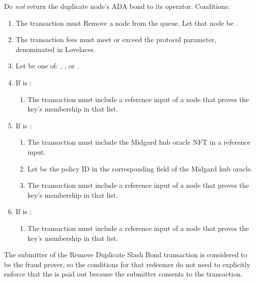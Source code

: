 \documentclass[../midgard.tex]{subfiles}
\begin{document}
\begin{description}
      Do \emph{not} return the duplicate node's ADA bond to its operator.
      Conditions:
        \begin{enumerate}
            \item The transaction must Remove a node from the  queue.
              Let that node be .
            \item The transaction fees must meet or exceed the  protocol parameter, denominated in Lovelaces.
            \item Let  be one of: , , or .
            \item If  is :
                \begin{enumerate}
                    \item The transaction must include a reference input of a  node that proves the  key's membership in that list.
                \end{enumerate}
            \item If  is :
                \begin{enumerate}
                    \item The transaction must include the Midgard hub oracle NFT in a reference input.
                    \item Let  be the policy ID in the corresponding field of the Midgard hub oracle.
                    \item The transaction must include a reference input of a  node that proves the  key's membership in that list.
                \end{enumerate}
            \item If  is :
                \begin{enumerate}
                    \item The transaction must include a reference input of a  node that proves the  key's membership in that list.
                \end{enumerate}
        \end{enumerate}
    The submitter of the Remove Duplicate Slash Bond transaction is considered to be the fraud prover, so the conditions for that redeemer do not need to explicitly enforce that the  is paid out because the submitter consents to the transaction.
\end{description}
\end{document}
